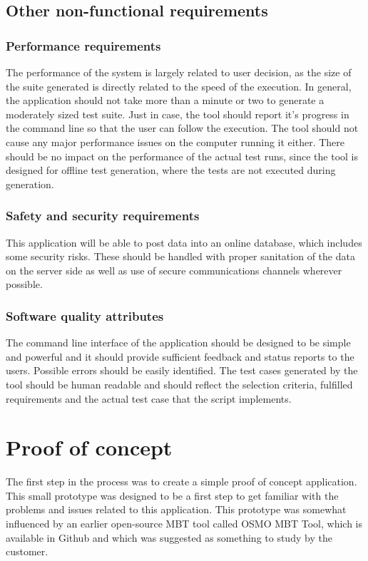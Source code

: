 \subsection{Other non-functional requirements}

\subsubsection{Performance requirements}
The performance of the system is largely related to user decision, as the size of the suite generated is directly related to the speed of the execution. In general, the application should not take more than a minute or two to generate a moderately sized test suite. Just in case, the tool should report it's progress in the command line so that the user can follow the execution. The tool should not cause any major performance issues on the computer running it either. There should be no impact on the performance of the actual test runs, since the tool is designed for offline test generation, where the tests are not executed during generation.

\subsubsection{Safety and security requirements}
This application will be able to post data into an online database, which includes some security risks. These should be handled with proper sanitation of the data on the server side as well as use of secure communications channels wherever possible.

\subsubsection{Software quality attributes}
The command line interface of the application should be designed to be simple and powerful and it should provide sufficient feedback and status reports to the users. Possible errors should be easily identified. The test cases generated by the tool should be human readable and should reflect the selection criteria, fulfilled requirements and the actual test case that the script implements.

\section{Proof of concept}
The first step in the process was to create a simple proof of concept application. This small prototype was designed to be a first step to get familiar with the problems and issues related to this application. This prototype was somewhat influenced by an earlier open-source MBT tool called OSMO MBT Tool, which is available in Github and which was suggested as something to study by the customer. \cite{OSMO}


